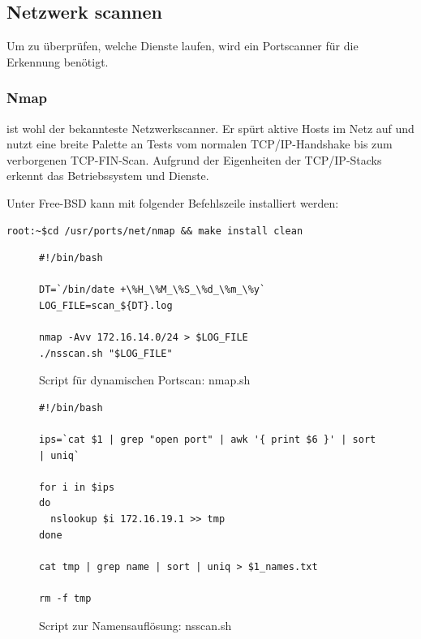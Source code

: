 \subsection{Netzwerk scannen}

Um zu überprüfen, welche Dienste laufen, wird ein Portscanner für die Erkennung
benötigt.

\subsubsection{Nmap}

\Nmap{} ist wohl der bekannteste Netzwerkscanner. Er spürt aktive Hosts im Netz auf
und nutzt eine breite Palette an Tests vom normalen TCP/IP-Handshake bis zum
verborgenen TCP-FIN-Scan. Aufgrund der Eigenheiten der TCP/IP-Stacks erkennt
\Nmap{} das Betriebssystem und Dienste.

Unter Free-BSD kann \Nmap{} mit folgender Befehlszeile installiert werden:

\begin{verbatim}
root:~$cd /usr/ports/net/nmap && make install clean
\end{verbatim}

\begin{figure}
\begin{lstlisting}
#!/bin/bash

DT=`/bin/date +\%H_\%M_\%S_\%d_\%m_\%y`
LOG_FILE=scan_${DT}.log

nmap -Avv 172.16.14.0/24 > $LOG_FILE
./nsscan.sh "$LOG_FILE"

\end{lstlisting}
\caption{Script für dynamischen Portscan: nmap.sh}
\end{figure}

\begin{figure}
\begin{lstlisting}
#!/bin/bash

ips=`cat $1 | grep "open port" | awk '{ print $6 }' | sort | uniq`

for i in $ips 
do
  nslookup $i 172.16.19.1 >> tmp 
done

cat tmp | grep name | sort | uniq > $1_names.txt

rm -f tmp
\end{lstlisting}
\caption{Script zur Namensauflösung: nsscan.sh}
\end{figure}


